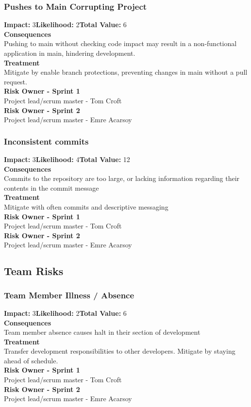 \documentclass[11pt]{article}
\begin{document}
\subsubsection{Pushes to Main Corrupting Project}
\textbf{Impact:} 3\quad \textbf{Likelihood:} 2\quad \textbf{Total Value:} 6\\
\textbf{Consequences}\\
Pushing to main without checking code impact may result in a non-functional application in main, hindering development.\\
\textbf{Treatment}\\
Mitigate by enable branch protections, preventing changes in main without a pull request.\\
\textbf{Risk Owner - Sprint 1}\\
Project lead/scrum master - Tom Croft\\
\textbf{Risk Owner - Sprint 2}\\
Project lead/scrum master - Emre Acarsoy
\subsubsection{Inconsistent commits}
\textbf{Impact:} 3\quad \textbf{Likelihood:} 4\quad \textbf{Total Value:} 12\\
\textbf{Consequences}\\
Commits to the repository are too large, or lacking information regarding their contents in the commit message\\
\textbf{Treatment}\\
Mitigate with often commits and descriptive messaging\\
\textbf{Risk Owner - Sprint 1}\\
Project lead/scrum master - Tom Croft\\
\textbf{Risk Owner - Sprint 2}\\
Project lead/scrum master - Emre Acarsoy
\subsection{Team Risks}
\subsubsection{Team Member Illness / Absence}
\textbf{Impact:} 3\quad \textbf{Likelihood:} 2\quad \textbf{Total Value:} 6\\
\textbf{Consequences}\\
Team member absence causes halt in their section of development\\
\textbf{Treatment}\\
Transfer development responsibilities to other developers. Mitigate by staying ahead of schedule.\\
\textbf{Risk Owner - Sprint 1}\\
Project lead/scrum master - Tom Croft\\
\textbf{Risk Owner - Sprint 2}\\
Project lead/scrum master - Emre Acarsoy
\end{document}
